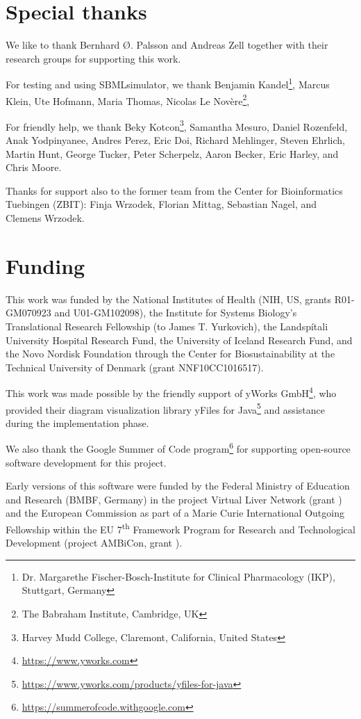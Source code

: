 \section{Special thanks}

We like to thank Bernhard \O. Palsson and Andreas Zell together with their research groups for supporting this work.

For testing and using SBMLsimulator, we thank
Benjamin Kandel\footnote{Dr. Margarethe Fischer-Bosch-Institute for Clinical Pharmacology (IKP), Stuttgart, Germany\label{fn:ikp}},
Marcus Klein,
Ute Hofmann,
Maria Thomas,
Nicolas Le Nov\`{e}re\footnote{The Babraham Institute, Cambridge, UK\label{fn:babraham}},

For friendly help, we thank Beky Kotcon\footnote{Harvey Mudd College, Claremont, California, United States\label{fn:harvey}}, Samantha Mesuro, Daniel Rozenfeld, Anak Yodpinyanee, Andres Perez, Eric Doi, Richard Mehlinger, Steven Ehrlich, Martin Hunt, George Tucker, Peter Scherpelz, Aaron Becker, Eric Harley, and Chris Moore.

Thanks for support also to the former team from the Center for Bioinformatics Tuebingen (ZBIT): Finja Wrzodek, Florian Mittag, Sebastian Nagel, and Clemens Wrzodek.

\section{Funding}

This work was funded by the National Institutes of Health (NIH, US, grants \numero R01-GM070923 and U01-GM102098), the Institute for Systems Biology's Translational Research Fellowship (to James T. Yurkovich), the Landsp\'itali University Hospital Research Fund, the University of Iceland Research Fund, and the Novo Nordisk Foundation through the Center for Biosustainability at the Technical University of Denmark (grant \numero NNF10CC1016517).

This work was made possible by the friendly support of yWorks GmbH\footnote{\url{https://www.yworks.com}}, who provided their diagram visualization library yFiles for Java\texttrademark\footnote{\url{https://www.yworks.com/products/yfiles-for-java}} and assistance during the implementation phase.

We also thank the Google Summer of Code program\footnote{\url{https://summerofcode.withgoogle.com}} for supporting open-source software development for this project.

Early versions of this software were funded by the Federal Ministry of Education and Research (BMBF, Germany) in the project Virtual Liver Network (grant ) and the European Commission as part of a Marie Curie International Outgoing Fellowship within the EU 7\textsuperscript{th} Framework Program for Research and Technological Development (project AMBiCon, grant ).
